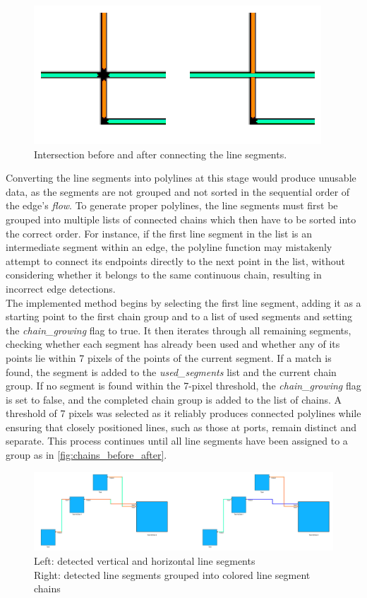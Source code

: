\begin{figure}[ht]
    \centering
    \includegraphics[width=0.7\linewidth]{pictures/intersection_before_after.png}
    \caption{Intersection before and after connecting the line segments.}
    \label{fig:intersection_before_after}
\end{figure}
Converting the line segments into polylines at this stage would produce unusable data, as the segments are not grouped and not sorted in the sequential order of the edge's \textit{flow}. To generate proper polylines, the line segments must first be grouped into multiple lists of connected chains which then have to be sorted into the correct order. For instance, if the first line segment in the list is an intermediate segment within an edge, the polyline function may mistakenly attempt to connect its endpoints directly to the next point in the list, without considering whether it belongs to the same continuous chain, resulting in incorrect edge detections.\\
The implemented method begins by selecting the first line segment, adding it as a starting point to the first chain group and to a list of used segments and setting the \textit{chain\_growing} flag to true. It then iterates through all remaining segments, checking whether each segment has already been used and whether any of its points lie within 7 pixels of the points of the current segment. If a match is found, the segment is added to the \textit{used\_segments} list and the current chain group. If no segment is found within the 7-pixel threshold, the \textit{chain\_growing} flag is set to false, and the completed chain group is added to the list of chains. A threshold of 7 pixels was selected as it reliably produces connected polylines while ensuring that closely positioned lines, such as those at ports, remain distinct and separate. This process continues until all line segments have been assigned to a group as in \autoref{fig:chains_before_after}.
\begin{figure}[ht]
    \centering
    \includegraphics[width=\linewidth]{pictures/chains_before_after.png}
    \caption{Left: detected vertical and horizontal line segments\\Right: detected line segments grouped into colored line segment chains} %
    \label{fig:chains_before_after}
\end{figure}\\

